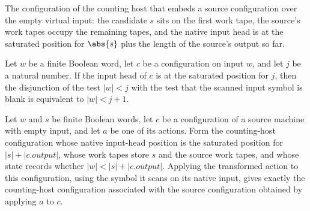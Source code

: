 \begin{definition}
\label{Turing.FinTM.splitCountCfg}
\leanok
{}
The configuration of the counting host that embeds a source configuration
over the empty virtual input: the candidate $s$ sits on the first work tape,
the source's work tapes occupy the remaining tapes, and the native input head
is at the saturated position for $\abs{s}$ plus the length of the source's
output so far.
\end{definition}

\begin{lemma}
\label{Turing.FinTM.splitCount_over}
\leanok
{}
Let $w$ be a finite Boolean word, let $c$ be a configuration on input $w$, and let $j$
be a natural number. If the input head of $c$ is at the saturated position for $j$, then
the disjunction of the test $|w|<j$ with the test that the scanned input symbol is blank
is equivalent to $|w|<j+1$.
\end{lemma}

\begin{lemma}
\label{Turing.FinTM.splitCount_apply}
\leanok
{}
Let $w$ and $s$ be finite Boolean words, let $c$ be a configuration of a source machine
with empty input, and let $a$ be one of its actions. Form the counting-host
configuration whose native input-head position is the saturated position for
$|s|+|c.output|$, whose work tapes store $s$ and the source work tapes, and whose state
records whether $|w|<|s|+|c.output|$. Applying the transformed action to this
configuration, using the symbol it scans on its native input, gives exactly the
counting-host configuration associated with the source configuration obtained by
applying $a$ to $c$.
\end{lemma}

